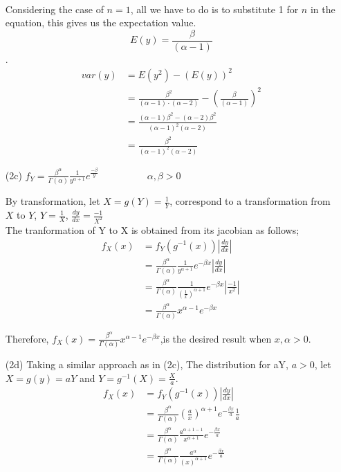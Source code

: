 \documentclass[12pt,a4paper]{article}
\begin{document}
\begin{itemize}
\begin{align*}
\end{align*}
Considering the case of $n=1$, all we have to do is to substitute 1 for $n$ in the equation, this gives us the expectation value.\\$$E\left(y\right)=\frac{\beta}{\left(\alpha-1\right)}$$.
\begin{align*}
var\left(y\right)&=E\left(y^{2}\right)-\left( E\left(y\right)\right)^{2}\\
&=\frac{\beta^{2}}{\left(\alpha-1\right)\cdot\left(\alpha-2\right)}-\left(\frac{\beta}{\left(\alpha-1\right)}\right)^{2}\\
&=\frac{\left(\alpha-1\right)\beta^{2}-\left(\alpha-2\right)\beta^{2}}{\left(\alpha-1\right)^{2}\left(\alpha-2\right)}\\
&=\frac{\beta^{2}}{\left(\alpha-1\right)^{2}\left(\alpha-2\right)}
\end{align*}
\newpage
\item[(2c)]$f_Y = \frac{\beta^\alpha}{\Gamma(\alpha)} \frac{1}{y^{\alpha + 1}} e^{\frac{-\beta}{y}} \quad \quad \quad\quad\quad \alpha,\beta>0$

By transformation, let $X=g\left(Y\right)=\frac{1}{Y} $, correspond to a transformation from $X$ to $Y$, $Y=\frac{1}{X}$, $\frac{dy}{dx}=  \frac{-1}{X^{2}}$\\

The tranformation of Y to X is obtained from its jacobian as follows;\\
\begin{align*}
f_X(x)&= f_Y(g^{-1}(x))|\frac{dy}{dx}| \quad\\
&=\frac{\beta^\alpha}{\Gamma(\alpha)} \frac{1}{y^{\alpha + 1}} e^{-\beta x}|\frac{dy}{dx}|\\
&=\frac{\beta^\alpha}{\Gamma(\alpha)} \frac{1}{\left(\frac{1}{x}\right)^{\alpha + 1}} e^{{-\beta x}}|\frac{-1}{x^{2}}|\\
&=\frac{\beta^\alpha}{\Gamma(\alpha)}x^{\alpha-1}e^{-\beta x}
\end{align*}

Therefore, $f_X(x)=\frac{\beta^\alpha}{\Gamma(\alpha)}x^{\alpha-1}e^{-\beta x}$,\quad is the desired result when $x,  \alpha>0$.
\item[(2d)] Taking a similar approach as in (2c), The distribution for aY, $a>0$, let $X=g(y)=aY$ and $Y=g^{-1}(X) = \frac{X}{a}$.
\begin{align*}
f_X(x) &= f_Y(g^{-1}(x))|\frac{dy}{dx}|\\
&= \frac{\beta^\alpha}{\Gamma(\alpha)} \left( \frac{a}{x}\right) ^{\alpha + 1} e^{-\frac{\beta x}{a} } \frac{1}{a}\\
&=\frac{\beta^\alpha}{\Gamma(\alpha)}\frac{a ^{\alpha + 1-1} }{x^{\alpha+1}}e^{-\frac{\beta x}{a} }\\
&=\frac{\beta^\alpha}{\Gamma(\alpha)} \frac{a^{\alpha}} {\left(x\right)^{\alpha + 1} } e^{-\frac{\beta x}{a} } \\
\end{align*}


\end{itemize}
\end{document}
